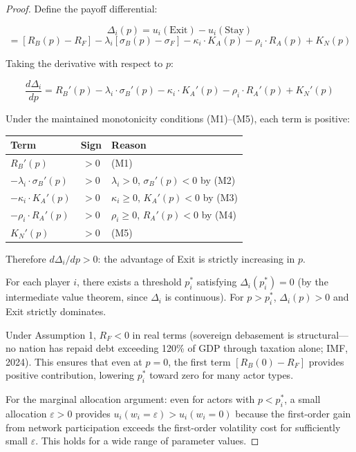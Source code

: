 \documentclass[12pt]{article}
\theoremstyle{definition}
\theoremstyle{remark}
\begin{document}
\begin{proof}
Define the payoff differential:

\[
\Delta_i(p) = u_i(\text{Exit}) - u_i(\text{Stay})
\]
\[
= [R_B(p) - R_F] - \lambda_i[\sigma_B(p) - \sigma_F] - \kappa_i \cdot K_A(p) - \rho_i \cdot R_A(p) + K_N(p)
\]

Taking the derivative with respect to $p$:

\[
\frac{d\Delta_i}{dp} = R_B'(p) - \lambda_i \cdot \sigma_B'(p) - \kappa_i \cdot K_A'(p) - \rho_i \cdot R_A'(p) + K_N'(p)
\]

Under the maintained monotonicity conditions (M1)--(M5), each term is
positive:

\begin{table}[h]
\centering
\begin{tabular}{lcl}
\toprule
Term & Sign & Reason \\
\midrule
$R_B'(p)$ & $> 0$ & (M1) \\
$-\lambda_i \cdot \sigma_B'(p)$ & $> 0$ & $\lambda_i > 0$, $\sigma_B'(p) < 0$ by (M2) \\
$-\kappa_i \cdot K_A'(p)$ & $> 0$ & $\kappa_i \geq 0$, $K_A'(p) < 0$ by (M3) \\
$-\rho_i \cdot R_A'(p)$ & $> 0$ & $\rho_i \geq 0$, $R_A'(p) < 0$ by (M4) \\
$K_N'(p)$ & $> 0$ & (M5) \\
\bottomrule
\end{tabular}
\end{table}

\noindent Therefore $d\Delta_i/dp > 0$: the advantage of Exit is strictly increasing
in $p$.

For each player $i$, there exists a threshold $p_i^*$ satisfying
$\Delta_i(p_i^*) = 0$ (by the intermediate value theorem, since $\Delta_i$
is continuous). For $p > p_i^*$, $\Delta_i(p) > 0$ and Exit strictly
dominates.

Under Assumption 1, $R_F < 0$ in real terms (sovereign debasement is
structural---no nation has repaid debt exceeding 120\% of GDP through
taxation alone; IMF, 2024). This ensures that even at $p = 0$, the
first term $[R_B(0) - R_F]$ provides positive contribution, lowering
$p_i^*$ toward zero for many actor types.

For the marginal allocation argument: even for actors with $p < p_i^*$,
a small allocation $\varepsilon > 0$ provides $u_i(w_i = \varepsilon) > u_i(w_i = 0)$
because the first-order gain from network participation exceeds the
first-order volatility cost for sufficiently small $\varepsilon$. This
holds for a wide range of parameter values.
\end{proof}
\end{document}
